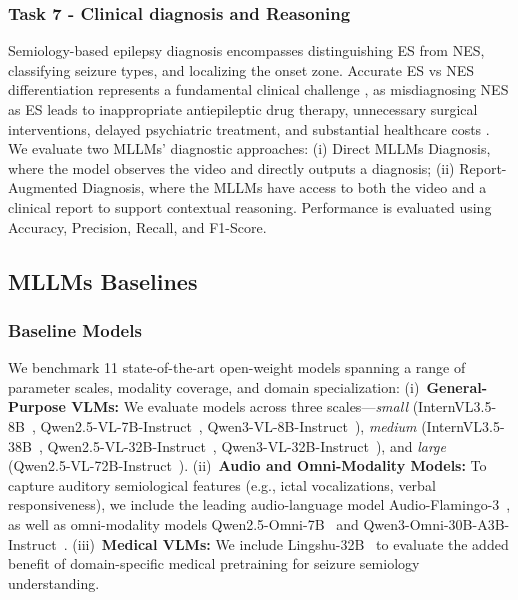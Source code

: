 \documentclass{article}
\theoremstyle{plain}
\theoremstyle{definition}
\theoremstyle{remark}
\begin{document}
\subsubsection{Task 7 - Clinical diagnosis and Reasoning}
\label{subsubsec:tasks7_metrics}

Semiology-based epilepsy diagnosis encompasses distinguishing ES from NES, classifying seizure types, and localizing the onset zone. Accurate ES vs NES differentiation represents a fundamental clinical challenge \cite{reuber2003psychogenic, devinsky2011diagnosing}, as misdiagnosing NES as ES leads to inappropriate antiepileptic drug therapy, unnecessary surgical interventions, delayed psychiatric treatment, and substantial healthcare costs \cite{reuber2003psychogenic,devinsky2011diagnosing}. We evaluate two MLLMs' diagnostic approaches: (i) Direct MLLMs Diagnosis, where the model observes the video and directly outputs a diagnosis; (ii) Report-Augmented Diagnosis, where the MLLMs have access to both the video and a clinical report to support contextual reasoning. Performance is evaluated using Accuracy, Precision, Recall, and F1-Score.

\subsection{MLLMs Baselines}

\subsubsection{Baseline Models}

We benchmark 11 state-of-the-art open-weight models spanning a range of parameter scales, modality coverage, and domain specialization: (i)~\textbf{General-Purpose VLMs:} We evaluate models across three scales—\textit{small} (InternVL3.5-8B~\cite{wang2025internVL3_5}, Qwen2.5-VL-7B-Instruct~\cite{bai2025Qwen2_5_vl}, Qwen3-VL-8B-Instruct~\cite{yang2025qwen3}), \textit{medium} (InternVL3.5-38B~\cite{wang2025internVL3_5}, Qwen2.5-VL-32B-Instruct~\cite{bai2025Qwen2_5_vl}, Qwen3-VL-32B-Instruct~\cite{yang2025qwen3}), and \textit{large} (Qwen2.5-VL-72B-Instruct~\cite{xu2025qwen2_5_omni}). (ii)~\textbf{Audio and Omni-Modality Models:} To capture auditory semiological features (e.g., ictal vocalizations, verbal responsiveness), we include the leading audio-language model Audio-Flamingo-3~\cite{fang2025audioflamingo3}, as well as omni-modality models Qwen2.5-Omni-7B~\cite{xu2025qwen2_5_omni} and Qwen3-Omni-30B-A3B-Instruct~\cite{xu2025qwen3_omni}. (iii)~\textbf{Medical VLMs:} We include Lingshu-32B~\cite{xu2025lingshu} to evaluate the added benefit of domain-specific medical pretraining for seizure semiology understanding. 
\end{document}
